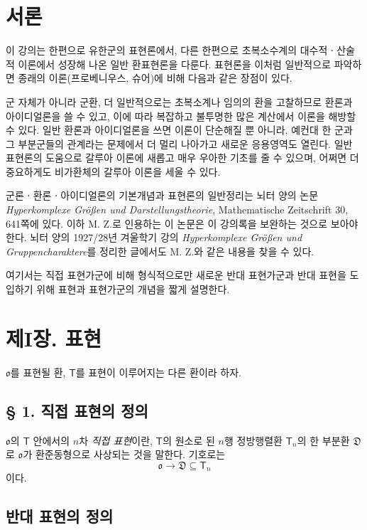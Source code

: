 \section*{서론}

이 강의는 한편으로 유한군의 표현론에서, 다른 한편으로 초복소수계의 대수적ㆍ산술적 이론에서 성장해 나온 일반 환표현론을 다룬다. 표현론을 이처럼 일반적으로 파악하면 종래의 이론(프로베니우스, 슈어)에 비해 다음과 같은 장점이 있다.

군 자체가 아니라 군환, 더 일반적으로는 초복소계나 임의의 환을 고찰하므로 환론과 아이디얼론을 쓸 수 있고, 이에 따라 복잡하고 불투명한 많은 계산에서 이론을 해방할 수 있다. 일반 환론과 아이디얼론을 쓰면 이론이 단순해질 뿐 아니라, 예컨대 한 군과 그 부분군들의 관계라는 문제에서 더 멀리 나아가고 새로운 응용영역도 열린다. 일반 표현론의 도움으로 갈루아 이론에 새롭고 매우 우아한 기초를 줄 수 있으며, 어쩌면 더 중요하게도 비가환체의 갈루아 이론을 세울 수 있다.

군론ㆍ환론ㆍ아이디얼론의 기본개념과 표현론의 일반정리는 뇌터 양의 논문 \emph{Hyperkomplexe Größen und Darstellungstheorie}, Mathematische Zeitschrift 30, 641쪽에 있다. 이하 M. Z.로 인용하는 이 논문은 이 강의록을 보완하는 것으로 보아야 한다. 뇌터 양의 1927/28년 겨울학기 강의 \emph{Hyperkomplexe Größen und Gruppencharaktere}를 정리한 글에서도 M. Z.와 같은 내용을 찾을 수 있다.

여기서는 직접 표현가군에 비해 형식적으로만 새로운 반대 표현가군과 반대 표현을 도입하기 위해 표현과 표현가군의 개념을 짧게 설명한다.

\section*{제I장. 표현}

\(\mathfrak{o}\)를 표현될 환, \(\mathsf T\)를 표현이 이루어지는 다른 환이라 하자.

\subsection*{§ 1. 직접 표현의 정의}

\(\mathfrak{o}\)의 \(\mathsf T\) 안에서의 \(n\)차 \emph{직접 표현}이란, \(\mathsf T\)의 원소로 된 \(n\)행 정방행렬환 \(\mathsf T_n\)의 한 부분환 \(\mathfrak D\)로 \(\mathfrak{o}\)가 환준동형으로 사상되는 것을 말한다. 기호로는
\[
        \mathfrak{o}\longrightarrow\mathfrak D\subseteq\mathsf T_n
\]
이다.

\subsection*{반대 표현의 정의}

